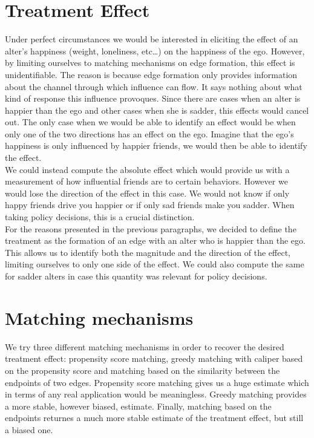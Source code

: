 \documentclass[11pt]{article}
\begin{document}
\section{Treatment Effect}
\label{Treatment Effect}
Under perfect circumstances we would be interested in eliciting the effect of an alter’s happiness (weight, loneliness, etc…) on the happiness of the ego. However, by limiting ourselves to matching mechanisms on edge formation, this effect is unidentifiable. The reason is because edge formation only provides information about the channel through which influence can flow. It says nothing about what kind of response this influence provoques. Since there are cases when an alter is happier than the ego and other cases when she is sadder, this effects would cancel out. The only case when we would be able to identify an effect would be when only one of the two directions has an effect on the ego. Imagine that the ego’s happiness is only influenced by happier friends, we would then be able to identify the effect. \\

We could instead compute the absolute effect which would provide us with a measurement of how influential friends are to certain behaviors. However we would lose the direction of the effect in this case. We would not know if only happy friends drive you happier or if only sad friends make you sadder. When taking policy decisions, this is a crucial distinction. \\

For the reasons presented in the previous paragraphs, we decided to define the treatment as the formation of an edge with an alter who is happier than the ego. This allows us to identify both the magnitude and the direction of the effect, limiting ourselves to only one side of the effect. We could also compute the same for sadder alters in case this quantity was relevant for policy decisions. \\

\section{Matching mechanisms}
\label{Matching Mechanisms}
We try three different matching mechanisms in order to recover the desired treatment effect: propensity score matching, greedy matching with caliper based on the propensity score and matching based on the similarity between the endpoints of two edges. Propensity score matching gives us a huge estimate which in terms of any real application would be meaningless. Greedy matching provides a more stable, however biased, estimate. Finally, matching based on the endpoints returnes a much more stable estimate of the treatment effect, but still a biased one. 
\end{document}
